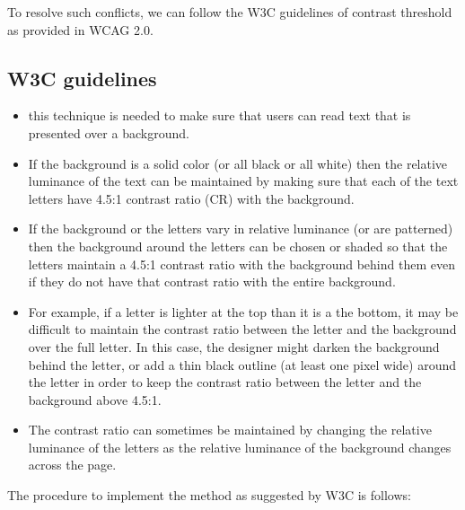 To resolve such conflicts, we can follow the W3C guidelines of contrast threshold as provided in WCAG 2.0. 

\subsection{W3C guidelines} %
\label{W3C guidelines}

\begin{itemize}
\item{}this technique is needed to make sure that users can read text that is presented over a background. 

\item{}If the background is a solid color (or all black or all white) then the relative luminance of the text can be maintained by making sure that each of the text letters have 4.5:1 contrast ratio (CR) with the background.

\item{}If the background or the letters vary in relative luminance (or are patterned) then the background around the letters can be chosen or shaded so that the letters maintain a 4.5:1 contrast ratio with the background behind them even if they do not have that contrast ratio with the entire background.

\item{}For example, if a letter is lighter at the top than it is a the bottom, it may be difficult to maintain the contrast ratio between the letter and the background over the full letter. In this case, the designer might darken the background behind the letter, or add a thin black outline (at least one pixel wide) around the letter in order to keep the contrast ratio between the letter and the background above 4.5:1.

\item{}The contrast ratio can sometimes be maintained by changing the relative luminance of the letters as the relative luminance of the background changes across the page.

\end{itemize}

The procedure to implement the method as suggested by W3C is follows:

